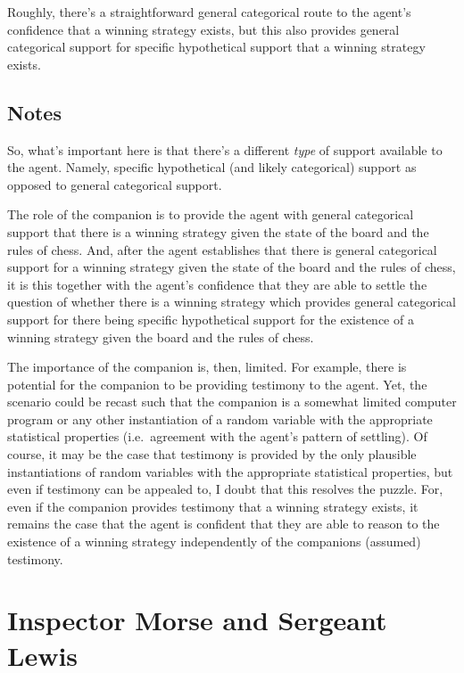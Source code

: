 \documentclass[10pt]{article}
\begin{document}
Roughly, there's a straightforward general categorical route to the agent's confidence that a winning strategy exists, but this also provides general categorical support for specific hypothetical support that a winning strategy exists.

\subsection{Notes}
\label{sec:notes}

So, what's important here is that there's a different \emph{type} of support available to the agent.
Namely, specific hypothetical (and likely categorical) support as opposed to general categorical support.

The role of the companion is to provide the agent with general categorical support that there is a winning strategy given the state of the board and the rules of chess.
And, after the agent establishes that there is general categorical support for a winning strategy given the state of the board and the rules of chess, it is this together with the agent's confidence that they are able to settle the question of whether there is a winning strategy which provides general categorical support for there being specific hypothetical support for the existence of a winning strategy given the board and the rules of chess.

The importance of the companion is, then, limited.
For example, there is potential for the companion to be providing testimony to the agent.
Yet, the scenario could be recast such that the companion is a somewhat limited computer program or any other instantiation of a random variable with the appropriate statistical properties (i.e.\ agreement with the agent's pattern of settling).
Of course, it may be the case that testimony is provided by the only plausible instantiations of random variables with the appropriate statistical properties, but even if testimony can be appealed to, I doubt that this resolves the puzzle.
For, even if the companion provides testimony that a winning strategy exists, it remains the case that the agent is confident that they are able to reason to the existence of a winning strategy independently of the companions (assumed) testimony.


\section{Inspector Morse and Sergeant Lewis}
\label{sec:second-case}
\end{document}

